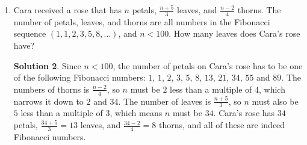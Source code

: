 \documentclass{article}
\theoremstyle{definition}
\newtheorem*{solution}{Solution}
\begin{document}
\begin{enumerate}
        Northeast-Southwest (NE-SW), North-South (N-S), and Northwest-Southeast
        (NW-SE). If the lawn is first mowed E-W on Day $1$, on Day $201$ in
        which direction is the lawn mowed, E-W, NE-SW, N-S, or NW-SE?
        \begin{solution}
            The lawn is mowed on days $1, 6, 11, 16, \dot, 191, 196, 201$. This
            is an arithmetic sequence and the common difference is $5$, since
            the lawn is mowed every $5$ days. To get from $1$ to $201$, the
            common difference will have been added $\frac{201 - 1}{5} =
            \frac{200}{5} = 40$ times. This means day $201$ will be the $41$st
            mowing. For the first $40$ mowing days, the lawn will have been
            mowed $\frac{40}{4} = 10$ times in each of the directions E-W,
            NE-SW, N-S, and NW-SE. Therefore, for the $41$st mowing, on Day
            $201$, the sequence of directions will begin again with a mowing in
            the direction of E-W or East-West.
        \end{solution}
        \item Cara received a rose that has $n$ petals, $\frac{n + 5}{3}$
        leaves, and $\frac{n-2}{4}$ thorns. The number of petals, leaves, and
        thorns are all numbers in the Fibonacci sequence $(1, 1, 2, 3, 5, 8,
        \dots)$, and $n < 100$. How many leaves does Cara's rose have?
        \begin{solution}
            Since $n < 100$, the number of petals on Cara's rose has to be one
            of the following Fibonacci numbers: $1$, $1$, $2$, $3$, $5$, $8$,
            $13$, $21$, $34$, $55$ and $89$. The numbers of thorns is $\frac{n -
            2}{4}$, so $n$ must be $2$ less than a multiple of $4$, which
            narrows it down to $2$ and $34$. The number of leaves is $\frac{n +
            5}{3}$, so $n$ must also be $5$ less than a multiple of $3$, which
            means $n$ must be $34$. Cara's rose has $34$ petals, $\frac{34 +
            5}{3} = 13$ leaves, and $\frac{34 - 2}{4} = 8$ thorns, and all of
            these are indeed Fibonacci numbers.
        \end{solution}
    \end{enumerate}
\end{document}
